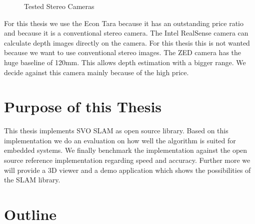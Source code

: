 \documentclass[11pt,a4paper,titlepage,oneside]{report}
\begin{document}
\begin{figure}[H]
  \centering
  \caption{Tested Stereo Cameras}\label{fig:cameras}
\end{figure}


For this thesis we use the Econ Tara because it has an outstanding price ratio and because it is a conventional stereo camera. The Intel RealSense camera can calculate depth images directly on the camera. For this thesis this is not wanted because we want to use conventional stereo images. The ZED camera has the huge baseline of 120mm. This allows depth estimation with a bigger range. We decide against this camera mainly because of the high price.

\section{Purpose of this Thesis}

This thesis implements SVO SLAM as open source library. Based on this implementation we do an evaluation on how well the algorithm is suited for embedded systems. We finally benchmark the implementation against the open source reference implementation regarding speed and accuracy. Further more we will provide a 3D viewer and a demo application which shows the possibilities of the SLAM library.

\section{Outline}
\end{document}
